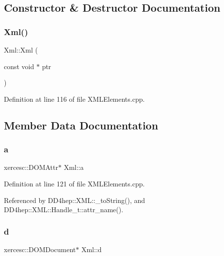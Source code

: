 \subsection{Constructor \& Destructor Documentation}
\hypertarget{union_xml_a96480dcc1523d3be6c9b93187f336ac0}{}\label{union_xml_a96480dcc1523d3be6c9b93187f336ac0} 
\subsubsection{\texorpdfstring{Xml()}{Xml()}}
{\footnotesize\ttfamily Xml\+::\+Xml (\begin{DoxyParamCaption}\item[{const void $\ast$}]{ptr }\end{DoxyParamCaption})\hspace{0.3cm}{\ttfamily [inline]}}



Definition at line 116 of file X\+M\+L\+Elements.\+cpp.



\subsection{Member Data Documentation}
\hypertarget{union_xml_a5a994b5f4b681d2f041c7c1261565c4e}{}\label{union_xml_a5a994b5f4b681d2f041c7c1261565c4e} 
\subsubsection{\texorpdfstring{a}{a}}
{\footnotesize\ttfamily xercesc\+::\+D\+O\+M\+Attr$\ast$ Xml\+::a}



Definition at line 121 of file X\+M\+L\+Elements.\+cpp.



Referenced by D\+D4hep\+::\+X\+M\+L\+::\+\_\+to\+String(), and D\+D4hep\+::\+X\+M\+L\+::\+Handle\+\_\+t\+::attr\+\_\+name().

\hypertarget{union_xml_a3f663e54c774ae9eb843e0c8b0abd337}{}\label{union_xml_a3f663e54c774ae9eb843e0c8b0abd337} 
\subsubsection{\texorpdfstring{d}{d}}
{\footnotesize\ttfamily xercesc\+::\+D\+O\+M\+Document$\ast$ Xml\+::d}



